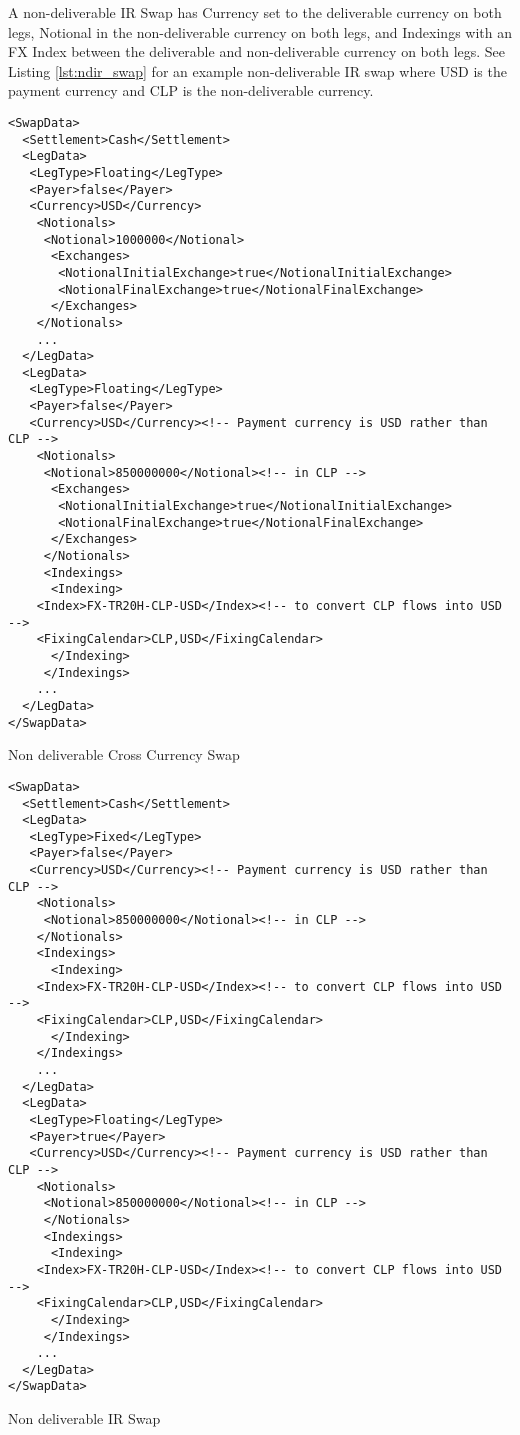 A non-deliverable IR Swap has Currency set to the deliverable currency on both legs, Notional in the non-deliverable currency on both legs, and Indexings with an FX Index between the deliverable and non-deliverable currency on both legs. See Listing \ref{lst:ndir_swap} for an example non-deliverable IR swap where USD is the payment currency and CLP is the non-deliverable currency.

\begin{listing}[H]
\begin{verbatim}
<SwapData>
  <Settlement>Cash</Settlement>
  <LegData>
   <LegType>Floating</LegType>
   <Payer>false</Payer>  
   <Currency>USD</Currency>
    <Notionals>
     <Notional>1000000</Notional>
      <Exchanges>
       <NotionalInitialExchange>true</NotionalInitialExchange>
       <NotionalFinalExchange>true</NotionalFinalExchange>
      </Exchanges>
    </Notionals>
    ...
  </LegData>
  <LegData>
   <LegType>Floating</LegType>
   <Payer>false</Payer>  
   <Currency>USD</Currency><!-- Payment currency is USD rather than CLP -->
    <Notionals>
     <Notional>850000000</Notional><!-- in CLP -->
      <Exchanges>
       <NotionalInitialExchange>true</NotionalInitialExchange>
       <NotionalFinalExchange>true</NotionalFinalExchange>
      </Exchanges>
     </Notionals>
     <Indexings>
      <Indexing>
	<Index>FX-TR20H-CLP-USD</Index><!-- to convert CLP flows into USD -->
	<FixingCalendar>CLP,USD</FixingCalendar>
      </Indexing>
     </Indexings>     
    ...
  </LegData>
</SwapData>
\end{verbatim}
\caption{Non deliverable Cross Currency Swap}
\label{lst:ndir_xccy_swap}
\end{listing}

\begin{listing}[H]
\begin{verbatim}
<SwapData>
  <Settlement>Cash</Settlement>
  <LegData>
   <LegType>Fixed</LegType>
   <Payer>false</Payer>  
   <Currency>USD</Currency><!-- Payment currency is USD rather than CLP -->
    <Notionals>
     <Notional>850000000</Notional><!-- in CLP -->
    </Notionals>
    <Indexings>
      <Indexing>
	<Index>FX-TR20H-CLP-USD</Index><!-- to convert CLP flows into USD -->
	<FixingCalendar>CLP,USD</FixingCalendar>
      </Indexing>
    </Indexings> 
    ...
  </LegData>
  <LegData>
   <LegType>Floating</LegType>
   <Payer>true</Payer>  
   <Currency>USD</Currency><!-- Payment currency is USD rather than CLP -->
    <Notionals>
     <Notional>850000000</Notional><!-- in CLP -->
     </Notionals>
     <Indexings>
      <Indexing>
	<Index>FX-TR20H-CLP-USD</Index><!-- to convert CLP flows into USD -->
	<FixingCalendar>CLP,USD</FixingCalendar>
      </Indexing>
     </Indexings>     
    ...    
  </LegData>
</SwapData>
\end{verbatim}
\caption{Non deliverable IR Swap}
\label{lst:ndir_swap}
\end{listing}